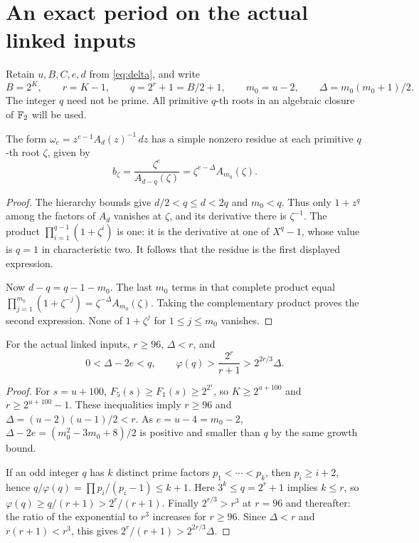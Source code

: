 \section{An exact period on the actual linked inputs}

Retain $u,B,C,e,d$ from \eqref{eq:delta}, and write
\[
 B=2^K,\qquad r=K-1,\qquad q=2^r+1=B/2+1,\qquad
 m_0=u-2,\qquad \Delta=m_0(m_0+1)/2.
\]
The integer $q$ need not be prime. All primitive $q$-th roots
in an algebraic closure of $\mathbb F_2$ will be used.

\begin{lemma}\label{lem:residue}
The form $\omega_e=z^{e-1}A_d(z)^{-1}\,dz$ has a simple nonzero
residue at each primitive $q$-th root $\zeta$, given by
\[
 b_\zeta=\frac{\zeta^e}{A_{d-q}(\zeta)}
                 =\zeta^{e-\Delta}A_{m_0}(\zeta).
\]
\end{lemma}
\begin{proof}
The hierarchy bounds give $d/2<q\le d<2q$ and $m_0<q$.
Thus only $1+z^q$ among the factors of $A_d$ vanishes at
$\zeta$, and its derivative there is $\zeta^{-1}$.
The product $\prod_{i=1}^{q-1}(1+\zeta^i)$ is one: it is
the derivative at one of $X^q-1$, whose value is $q=1$ in
characteristic two. It follows that the residue is the first
displayed expression.

Now $d-q=q-1-m_0$. The last $m_0$ terms in that complete
product equal
$\prod_{j=1}^{m_0}(1+\zeta^{-j})
  =\zeta^{-\Delta}A_{m_0}(\zeta)$.
Taking the complementary product proves the second expression.
None of $1+\zeta^j$ for $1\le j\le m_0$ vanishes.
\end{proof}

\begin{lemma}\label{lem:bounds}
For the actual linked inputs, $r\ge96$, $\Delta<r$, and
\[
 0<\Delta-2e<q,\qquad
 \varphi(q)>\frac{2^r}{r+1}>2^{2r/3}\Delta.
\]
\end{lemma}
\begin{proof}
For $s=u+100$, $F_5(s)\ge F_1(s)\ge2^{2^s}$, so
$K\ge2^{u+100}$ and $r\ge2^{u+100}-1$.
These inequalities imply $r\ge96$ and
$\Delta=(u-2)(u-1)/2<r$.
As $e=u-4=m_0-2$,
$\Delta-2e=(m_0^2-3m_0+8)/2$ is positive and smaller
than $q$ by the same growth bound.

If an odd integer $q$ has $k$ distinct prime factors
$p_1<\cdots<p_k$, then $p_i\ge i+2$, hence
$q/\varphi(q)=\prod p_i/(p_i-1)\le k+1$.
Here $3^k\le q=2^r+1$ implies $k\le r$, so
$\varphi(q)\ge q/(r+1)>2^r/(r+1)$.
Finally $2^{r/3}>r^3$ at $r=96$ and thereafter:
the ratio of the exponential to $r^3$ increases for $r\ge96$.
Since $\Delta<r$ and $r(r+1)<r^3$, this gives
$2^r/(r+1)>2^{2r/3}\Delta$.
\end{proof}

